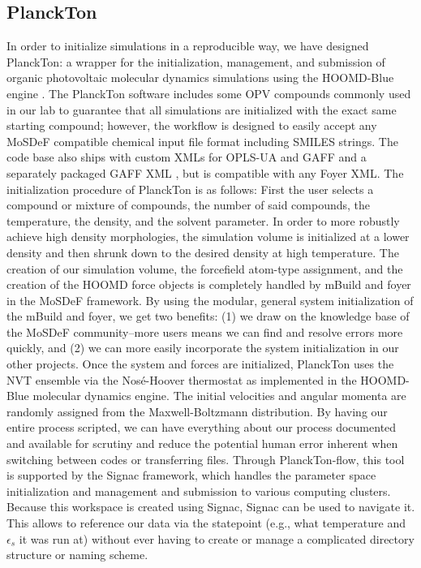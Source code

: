 \subsection{PlanckTon}
In order to initialize simulations in a reproducible way, we have designed PlanckTon: a wrapper for the initialization, management, and submission of organic photovoltaic molecular dynamics simulations using the HOOMD-Blue engine \citep{planckton, Jankowski2019, Anderson2020}.
The PlanckTon software includes some OPV compounds commonly used in our lab to guarantee that all simulations are initialized with the exact same starting compound; however, the workflow is designed to easily accept any MoSDeF compatible chemical input file format including SMILES strings. 
The code base also ships with custom XMLs for OPLS-UA and GAFF and a separately packaged GAFF XML \citep{DeFever}, but is compatible with any Foyer XML. 
The initialization procedure of PlanckTon is as follows: First the user selects a compound or mixture of compounds, the number of said compounds, the temperature, the density, and the solvent parameter. 
In order to more robustly achieve high density morphologies, the simulation volume is initialized at a lower density and then shrunk down to the desired density at high temperature\cite{Jankowski2013,Marsh2014,Jones2017,Henry2017a,Miller2018}. 
The creation of our simulation volume, the forcefield atom-type assignment, and the creation of the HOOMD force objects is completely handled by mBuild and foyer in the MoSDeF framework\citep{mbuild,foyer}.
By using the modular, general system initialization of the mBuild and foyer, we get two benefits: (1) we draw on the knowledge base of the MoSDeF community--more users means we can find and resolve errors more quickly, and (2) we can more easily incorporate the system initialization in our other projects. 
Once the system and forces are initialized, PlanckTon uses the NVT ensemble via the Nosé-Hoover thermostat \citep{Martyna1994d, Martyna1996} as implemented in the HOOMD-Blue molecular dynamics engine. 
The initial velocities and angular momenta are randomly assigned from the Maxwell-Boltzmann distribution.
By having our entire process scripted, we can have everything about our process documented and available for scrutiny and reduce the potential human error inherent when switching between codes or transferring files.
Through PlanckTon-flow, this tool is supported by the Signac framework, which handles the parameter space initialization and management and submission to various computing clusters. Because this workspace is created using Signac, Signac can be used to navigate it. This allows to reference our data via the statepoint (e.g., what temperature and $\epsilon_{s}$ it was run at) without ever having to create or manage a complicated directory structure or naming scheme.

